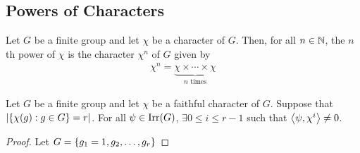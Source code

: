 \subsection{Powers of Characters}

\begin{boxnotation}
    Let $G$ be a finite group and let $\chi$ be a character of $G$. Then, for all $n \in \mathbb{N}$, the $n$th power of $\chi$ is the character $\chi^n$ of $G$ given by
    \begin{align*}
        \chi^n = \underbrace{\chi \times \cdots \times \chi}_{n \text{ times}}
    \end{align*}
\end{boxnotation}

\begin{theorem}
    Let $G$ be a finite group and let $\chi$ be a faithful character of $G$. Suppose that $\left\lvert \left\{ \chi(g) : g \in G \right\} = r \right\rvert$. For all $\psi \in \operatorname{Irr}\!\left( G \right)$, $\exists 0 \leq i \leq r - 1$ such that $\left\langle \psi, \chi^i \right\rangle \neq 0$.
\end{theorem}
\begin{proof}
    Let $G = \left\{ g_1 = 1, g_2, \ldots, g_r \right\}$
\end{proof}